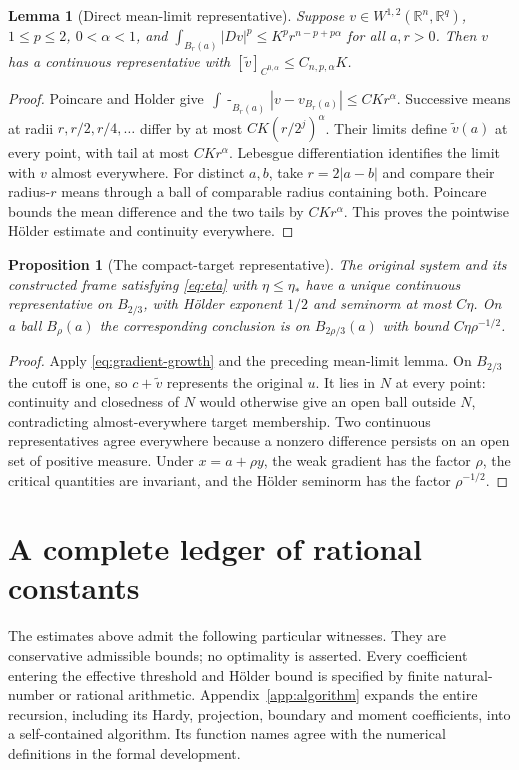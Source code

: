 \documentclass[reqno,11pt]{amsart}
\numberwithin{equation}{section}
\newtheorem{proposition}[theorem]{Proposition}
\newtheorem{lemma}[theorem]{Lemma}
\theoremstyle{definition}
\theoremstyle{remark}
\newcommand{\R}{\mathbb R}
\newcommand{\fint}{\mathop{\int\!\!\!\!-}}
\begin{document}
\begin{lemma}[Direct mean-limit representative]\label{lem:representative}
Suppose $v\in W^{1,2}(\R^n,\R^q)$, $1\leq p\leq2$, $0<\alpha<1$,
and
$\int_{B_r(a)}|Dv|^p\leq K^pr^{n-p+p\alpha}$ for all $a,r>0$.
Then $v$ has a continuous representative with
$[\widetilde v]_{C^{0,\alpha}}\leq C_{n,p,\alpha}K$.
\end{lemma}
\begin{proof}
Poincare and Holder give
$\fint_{B_r(a)}|v-v_{B_r(a)}|\leq CKr^\alpha$.
Successive means at radii $r,r/2,r/4,\ldots$ differ by at most
$CK(r/2^j)^\alpha$. Their limits define $\widetilde v(a)$ at every
point, with tail at most $CKr^\alpha$. Lebesgue differentiation
identifies the limit with $v$ almost everywhere. For distinct $a,b$,
take $r=2|a-b|$ and compare their radius-$r$ means through a ball
of comparable radius containing both. Poincare bounds the mean
difference and the two tails by $CKr^\alpha$. This proves the
pointwise H\"older estimate and continuity everywhere.
\end{proof}

\begin{proposition}[The compact-target representative]\label{prop:system-rep}
The original system and its constructed frame satisfying
\eqref{eq:eta} with $\eta\leq\eta_*$ have a unique continuous
representative on $B_{2/3}$, with H\"older exponent $1/2$ and seminorm
at most $C\eta$. On a ball $B_\rho(a)$ the corresponding conclusion
is on $B_{2\rho/3}(a)$ with bound $C\eta\rho^{-1/2}$.
\end{proposition}
\begin{proof}
Apply \eqref{eq:gradient-growth} and the preceding mean-limit lemma.
On $B_{2/3}$ the cutoff is one, so $c+\widetilde v$ represents the
original $u$. It lies in $N$ at every point: continuity and closedness
of $N$ would otherwise give an open ball outside $N$, contradicting
almost-everywhere target membership. Two continuous representatives
agree everywhere because a nonzero difference persists on an open set
of positive measure. Under $x=a+\rho y$, the weak gradient has the
factor $\rho$, the critical quantities are invariant, and the H\"older
seminorm has the factor $\rho^{-1/2}$.
\end{proof}

\section{A complete ledger of rational constants}\label{sec:constants}
The estimates above admit the following particular witnesses. They are
conservative admissible bounds; no optimality is asserted. Every coefficient
entering the effective threshold and H\"older bound is specified by finite
natural-number or rational arithmetic.
Appendix~\ref{app:algorithm} expands the entire recursion, including its
Hardy, projection, boundary and moment coefficients, into a self-contained
algorithm. Its function names agree with the numerical definitions in the
formal development.
\end{document}
